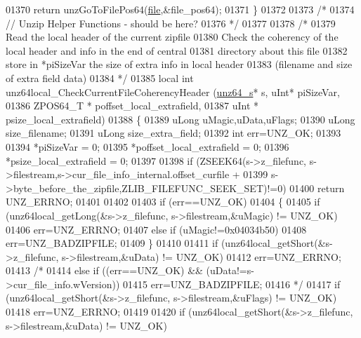 \begin{DoxyCode}
01370     \textcolor{keywordflow}{return} unzGoToFilePos64(\hyperlink{structfile}{file},&file\_pos64);
01371 \}
01372 
01373 \textcolor{comment}{/*}
01374 \textcolor{comment}{// Unzip Helper Functions - should be here?}
01376 \textcolor{comment}{*/}
01377 
01378 \textcolor{comment}{/*}
01379 \textcolor{comment}{  Read the local header of the current zipfile}
01380 \textcolor{comment}{  Check the coherency of the local header and info in the end of central}
01381 \textcolor{comment}{        directory about this file}
01382 \textcolor{comment}{  store in *piSizeVar the size of extra info in local header}
01383 \textcolor{comment}{        (filename and size of extra field data)}
01384 \textcolor{comment}{*/}
01385 local \textcolor{keywordtype}{int} unz64local\_CheckCurrentFileCoherencyHeader (\hyperlink{structunz64__s}{unz64\_s}* s, uInt* piSizeVar,
01386                                                     ZPOS64\_T * poffset\_local\_extrafield,
01387                                                     uInt  * psize\_local\_extrafield)
01388 \{
01389     uLong uMagic,uData,uFlags;
01390     uLong size\_filename;
01391     uLong size\_extra\_field;
01392     \textcolor{keywordtype}{int} err=UNZ\_OK;
01393 
01394     *piSizeVar = 0;
01395     *poffset\_local\_extrafield = 0;
01396     *psize\_local\_extrafield = 0;
01397 
01398     \textcolor{keywordflow}{if} (ZSEEK64(s->z\_filefunc, s->filestream,s->cur\_file\_info\_internal.offset\_curfile +
01399                                 s->byte\_before\_the\_zipfile,ZLIB\_FILEFUNC\_SEEK\_SET)!=0)
01400         \textcolor{keywordflow}{return} UNZ\_ERRNO;
01401 
01402 
01403     \textcolor{keywordflow}{if} (err==UNZ\_OK)
01404     \{
01405         \textcolor{keywordflow}{if} (unz64local\_getLong(&s->z\_filefunc, s->filestream,&uMagic) != UNZ\_OK)
01406             err=UNZ\_ERRNO;
01407         \textcolor{keywordflow}{else} \textcolor{keywordflow}{if} (uMagic!=0x04034b50)
01408             err=UNZ\_BADZIPFILE;
01409     \}
01410 
01411     \textcolor{keywordflow}{if} (unz64local\_getShort(&s->z\_filefunc, s->filestream,&uData) != UNZ\_OK)
01412         err=UNZ\_ERRNO;
01413 \textcolor{comment}{/*}
01414 \textcolor{comment}{    else if ((err==UNZ\_OK) && (uData!=s->cur\_file\_info.wVersion))}
01415 \textcolor{comment}{        err=UNZ\_BADZIPFILE;}
01416 \textcolor{comment}{*/}
01417     \textcolor{keywordflow}{if} (unz64local\_getShort(&s->z\_filefunc, s->filestream,&uFlags) != UNZ\_OK)
01418         err=UNZ\_ERRNO;
01419 
01420     \textcolor{keywordflow}{if} (unz64local\_getShort(&s->z\_filefunc, s->filestream,&uData) != UNZ\_OK)

\end{DoxyCode}
